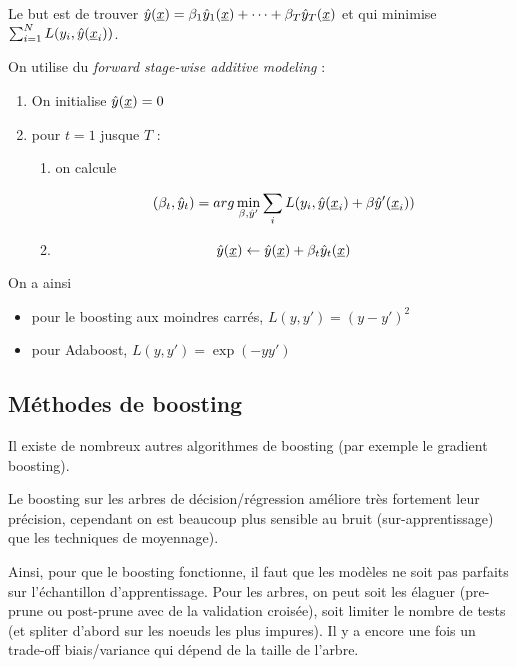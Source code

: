 	Le but est de trouver $\hat{y}(\underline{x}) = \beta_1 \hat{y}_1(\underline{x}) + \dots + \beta_T \hat{y}_T(\underline{x})$ et qui minimise $\sum_{i = 1}^N L(y_i, \hat{y}(\underline{x}_i))$.
	
	On utilise du \textit{forward stage-wise additive modeling} :
	
	\begin{enumerate}
		\item On initialise $\hat{y}(\underline{x}) = 0$
		\item pour $t = 1$ jusque $T$ :
		
		\begin{enumerate}
			\item on calcule
			
			$$(\beta_t, \hat{y}_t) = arg \min_{\beta, \hat{y}'} \sum_i L(y_i, \hat{y}(\underline{x}_i) + \beta \hat{y}'(\underline{x}_i))$$
			\item 
			
			$$\hat{y}(\underline{x}) \leftarrow \hat{y}(\underline{x}) + \beta_t \hat{y}_t(\underline{x})$$
		\end{enumerate}
	\end{enumerate}
	
	On a ainsi
	
	\begin{itemize}
		\item pour le boosting aux moindres carrés, $L(y, y') = (y - y')^2$
		\item pour Adaboost, $L(y, y') = \exp{(-y y')}$
	\end{itemize}
	
	
	\subsection{Méthodes de boosting}
	
	Il existe de nombreux autres algorithmes de boosting (par exemple le gradient boosting).
	
	Le boosting sur les arbres de décision/régression améliore très fortement leur précision, cependant on est beaucoup plus sensible au bruit (sur-apprentissage) que les techniques de moyennage).
	
	Ainsi, pour que le boosting fonctionne, il faut que les modèles ne soit pas parfaits sur l'échantillon d'apprentissage. Pour les arbres, on peut soit les élaguer (pre-prune ou post-prune avec de la validation croisée), soit limiter le nombre de tests (et spliter d'abord sur les noeuds les plus impures). Il y a encore une fois un trade-off biais/variance qui dépend de la taille de l'arbre.
	
